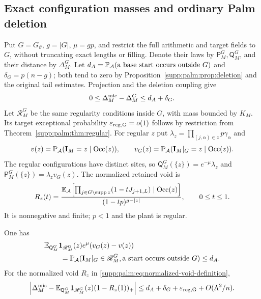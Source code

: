 \subsection{Exact configuration masses and ordinary Palm deletion}\label{supp:palm:subsec:palm}
Put $G=G_\vartheta$, $g=|G|$, $\mu=gp$, and restrict the full arithmetic and target fields to $G$, without truncating exact lengths or filling. Denote their laws by $\mathsf P_M^G,\mathsf Q_M^G$, and their distance by $\Delta_M^G$.
Let $d_A=\mathbb P_{\mathcal A}(\text{a base start occurs outside }G)$ and $\delta_G=p(n-g)$; both tend to zero by Proposition~\ref{supp:palm:prop:deletion} and the original tail estimates. Projection and the deletion coupling give
\begin{equation}\label{supp:palm:eq:projection}
 0\le\Delta_M^{\rm mic}-\Delta_M^G\le d_A+\delta_G.
\end{equation}
Let $\mathscr R_M^G$ be the same regularity conditions inside $G$, with mass bounded by $K_M$. Its target exceptional probability $\varepsilon_{\rm reg,G}=o(1)$ follows by restriction from Theorem~\ref{supp:palm:thm:regular}.
For regular $z$ put $\lambda_z=\prod_{(j,\alpha)\in z}p\gamma_\alpha$ and
\[
 v(z)=\mathbb P_{\mathcal A}(\mathbf I_M=z\mid\operatorname{Occ}(z)),\qquad
 v_G(z)=\mathbb P_{\mathcal A}(\mathbf I_M|_G=z\mid\operatorname{Occ}(z)).
\]
The regular configurations have distinct sites, so
$\mathsf Q_M^G(\{z\})=e^{-\mu}\lambda_z$ and
$\mathsf P_M^G(\{z\})=\lambda_zv_G(z)$.
The normalized retained void is
\begin{equation}\label{supp:palm:eq:normalized-void-definition}
 R_z(t)=\frac{\mathbb E_{\mathcal A}\!\left[
       \prod_{j\in G\setminus\operatorname{supp} z}(1-tJ_{j+1,L})
                       \mid\operatorname{Occ}(z)\right]}
                    {(1-tp)^{g-|z|}},\qquad0\le t\le1.
\end{equation}
It is nonnegative and finite; $p<1$ and the plant is regular.
\begin{proposition}\label{supp:palm:prop:palm}
One has
\begin{align}\label{supp:palm:eq:averaged-deletion}
 &\mathbb E_{\mathsf Q_M^G}\mathbf 1_{\mathscr R_M^G}(z)e^\mu(v_G(z)-v(z))\notag\\
 &\hspace{8mm}=\mathbb P_{\mathcal A}(\mathbf I_M|_G\in\mathscr R_M^G,
                     \text{a start occurs outside }G)\le d_A.
\end{align}
For the normalized void $R_z$ in \eqref{supp:palm:eq:normalized-void-definition},
\begin{equation}\label{supp:palm:eq:normalized-deficit}
 \left|\Delta_M^{\rm mic}
 -\mathbb E_{\mathsf Q_M^G}\mathbf 1_{\mathscr R_M^G}(z)(1-R_z(1))_+\right|
 \le d_A+\delta_G+\varepsilon_{\rm reg,G}+O(\Lambda^2/n).
\end{equation}
\end{proposition}
